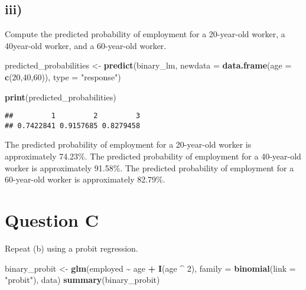 \documentclass[
]{article}
\newenvironment{Shaded}{\begin{snugshade}}{\end{snugshade}}
\newcommand{\AttributeTok}[1]{\textcolor[rgb]{0.13,0.29,0.53}{#1}}
\newcommand{\DecValTok}[1]{\textcolor[rgb]{0.00,0.00,0.81}{#1}}
\newcommand{\FunctionTok}[1]{\textcolor[rgb]{0.13,0.29,0.53}{\textbf{#1}}}
\newcommand{\NormalTok}[1]{#1}
\newcommand{\OtherTok}[1]{\textcolor[rgb]{0.56,0.35,0.01}{#1}}
\newcommand{\SpecialCharTok}[1]{\textcolor[rgb]{0.81,0.36,0.00}{\textbf{#1}}}
\newcommand{\StringTok}[1]{\textcolor[rgb]{0.31,0.60,0.02}{#1}}
\begin{document}
\hypertarget{iii}{%
\subsection{iii)}\label{iii}}

Compute the predicted probability of employment for a 20-year-old
worker, a 40year-old worker, and a 60-year-old worker.

\begin{Shaded}
\begin{Highlighting}[]
\NormalTok{predicted\_probabilities }\OtherTok{\textless{}{-}} \FunctionTok{predict}\NormalTok{(binary\_lm, }
                                   \AttributeTok{newdata =} \FunctionTok{data.frame}\NormalTok{(}\AttributeTok{age =} \FunctionTok{c}\NormalTok{(}\DecValTok{20}\NormalTok{,}\DecValTok{40}\NormalTok{,}\DecValTok{60}\NormalTok{)), }
                                   \AttributeTok{type =} \StringTok{"response"}\NormalTok{)}

\FunctionTok{print}\NormalTok{(predicted\_probabilities)}
\end{Highlighting}
\end{Shaded}

\begin{verbatim}
##         1         2         3 
## 0.7422841 0.9157685 0.8279458
\end{verbatim}

The predicted probability of employment for a 20-year-old worker is
approximately 74.23\%. The predicted probability of employment for a
40-year-old worker is approximately 91.58\%. The predicted probability
of employment for a 60-year-old worker is approximately 82.79\%.

\hypertarget{question-c}{%
\section{Question C}\label{question-c}}

Repeat (b) using a probit regression.

\begin{Shaded}
\begin{Highlighting}[]
\NormalTok{binary\_probit }\OtherTok{\textless{}{-}} \FunctionTok{glm}\NormalTok{(employed }\SpecialCharTok{\textasciitilde{}}\NormalTok{ age }\SpecialCharTok{+} \FunctionTok{I}\NormalTok{(age }\SpecialCharTok{\^{}} \DecValTok{2}\NormalTok{), }
                     \AttributeTok{family =} \FunctionTok{binomial}\NormalTok{(}\AttributeTok{link =} \StringTok{"probit"}\NormalTok{), }
\NormalTok{                     data)}
\FunctionTok{summary}\NormalTok{(binary\_probit)}
\end{Highlighting}
\end{Shaded}
\end{document}
